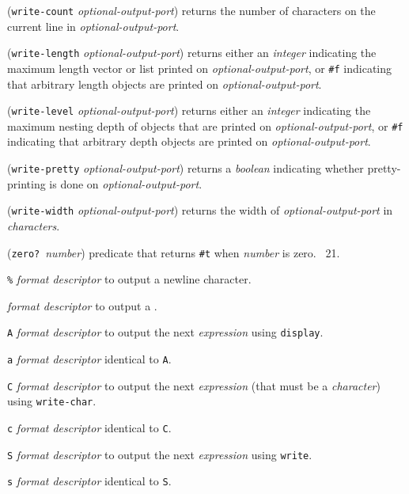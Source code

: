 \documentclass[10pt,twocolumn]{article}
\begin{document}
(\texttt{write-count} \emph{optional-output-port}) returns the number
of characters on the current line in \emph{optional-output-port}.

(\texttt{write-length} \emph{optional-output-port}) returns either an
\emph{integer} indicating the maximum length vector or list printed on
\emph{optional-output-port}, or \texttt{\#f} indicating that arbitrary
length objects are printed on \emph{optional-output-port}.

(\texttt{write-level} \emph{optional-output-port}) returns either an
\emph{integer} indicating the maximum nesting depth of objects that
are printed on \emph{optional-output-port}, or \texttt{\#f} indicating
that arbitrary depth objects are printed on
\emph{optional-output-port}.

(\texttt{write-pretty} \emph{optional-output-port}) returns a
\emph{boolean} indicating whether pretty-printing is done on
\emph{optional-output-port}.

(\texttt{write-width} \emph{optional-output-port}) returns the width
of \emph{optional-output-port} in \emph{characters}.

(\texttt{zero?}\ \emph{number}) predicate that returns \texttt{\#t}
when \emph{number} is zero.  \RRRRRS~21.

\texttt{\texttildelow\%} \emph{format descriptor} to output a newline
character.

\texttt{\texttildelow\texttildelow} \emph{format descriptor} to output
a \texttt{\texttildelow}.

\texttt{\texttildelow{}A} \emph{format descriptor} to output the next
\emph{expression} using \texttt{display}.

\texttt{\texttildelow{}a} \emph{format descriptor} identical to
\texttt{\texttildelow{}A}.

\texttt{\texttildelow{}C} \emph{format descriptor} to output the next
\emph{expression} (that must be a \emph{character}) using
\texttt{write-char}.

\texttt{\texttildelow{}c} \emph{format descriptor} identical to
\texttt{\texttildelow{}C}.

\texttt{\texttildelow{}S} \emph{format descriptor} to output the next
\emph{expression} using \texttt{write}.

\texttt{\texttildelow{}s} \emph{format descriptor} identical to
\texttt{\texttildelow{}S}.
\end{document}
